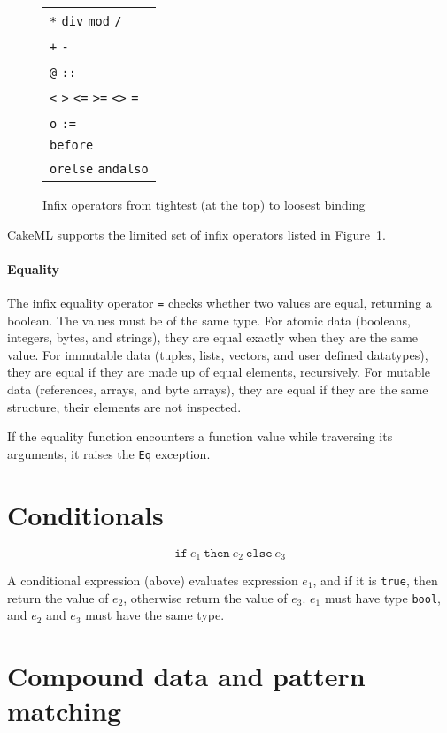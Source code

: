 \documentclass[12pt,a4paper]{book}
\begin{document}
\begin{figure}
\centering
\begin{tabular}{l}
 \texttt{*} \texttt{div} \texttt{mod} \texttt{/}\\
 \texttt{+} \texttt{-}\\
 \texttt{@} \texttt{::}\\
 \texttt{<} \texttt{>} \texttt{<=} \texttt{>=} \texttt{<>} \texttt{=}\\
 \texttt{o} \texttt{:=}\\
 \texttt{before}\\
 \texttt{orelse} \texttt{andalso}
 \end{tabular}
\caption{Infix operators from tightest (at the top) to loosest binding}
\label{precedences}
\end{figure}

CakeML supports the limited set of infix operators listed in Figure~\ref{precedences}.

\paragraph{Equality}

The infix equality operator \texttt{=} checks whether two values are equal, returning a boolean. The values must be of the same type. For atomic data (booleans, integers, bytes, and strings), they are equal exactly when they are the same value. For immutable data (tuples, lists, vectors, and user defined datatypes), they are equal if they are made up of equal elements, recursively. For mutable data (references, arrays, and byte arrays), they are equal if they are the same structure, their elements are not inspected.

If the equality function encounters a function value while traversing its arguments, it raises the \texttt{Eq} exception.

\section{Conditionals}
%
\[\texttt{if}\ e_1\ \texttt{then}\ e_2\ \texttt{else}\ e_3\]

A conditional expression (above) evaluates expression $e_1$, and if it is \texttt{true}, then return the value of $e_2$, otherwise return the value of $e_3$. $e_1$ must have type \texttt{bool}, and $e_2$ and $e_3$ must have the same type.

\section{Compound data and pattern matching}
\end{document}
